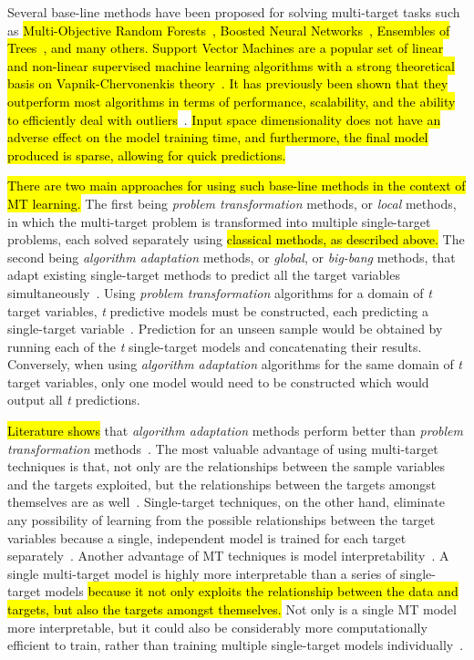 \documentclass[preprint,12pt]{elsarticle}
\begin{document}
Several base-line methods have been proposed for solving multi-target tasks such as \hl{Multi-Objective Random Forests~{\cite{Kocev2010}}, Boosted Neural Networks~{\cite{Hadavandi2015-2}}, Ensembles of Trees~{\cite{Kocev2013}}, and many others. Support Vector Machines are a popular set of linear and non-linear supervised machine learning algorithms with a strong theoretical basis on Vapnik-Chervonenkis theory~{\cite{Vapnik1995}}. It has previously been shown that they outperform most algorithms in terms of performance, scalability, and the ability to efficiently deal with outliers}~\cite{Drucker1997,Kecman}. \hl{Input space dimensionality does not have an adverse effect on the model training time, and furthermore, the final model produced is sparse, allowing for quick predictions.}

\hl{There are two main approaches for using such base-line methods in the context of MT learning.} The first being \textit{problem transformation} methods, or \textit{local} methods, in which the multi-target problem is transformed into multiple single-target problems, each solved separately using \hl{classical methods, as described above.} The second being \textit{algorithm adaptation} methods, or \textit{global}, or \textit{big-bang} methods, that adapt existing single-target methods to predict all the target variables simultaneously~\cite{Borchani2015,Kocev2015}.
Using \textit{problem transformation} algorithms for a domain of \textit{t} target variables, \textit{t} predictive models must be constructed, each predicting a single-target variable~\cite{Kocev2015}. Prediction for an unseen sample would be obtained by running each of the \textit{t} single-target models and concatenating their results. Conversely, when using \textit{algorithm adaptation} algorithms for the same domain of \textit{t} target variables, only one model would need to be constructed which would output all \textit{t} predictions.

\hl{Literature shows} that \textit{algorithm adaptation} methods perform better than \textit{problem transformation} methods~\cite{Kocev2015,Spyromitros2014}. The most valuable advantage of using multi-target techniques is that, not only are the relationships between the sample variables and the targets exploited, but the relationships between the targets amongst themselves are as well~\cite{Baxter1997,Caruana1997}. Single-target techniques, on the other hand, eliminate any possibility of learning from the possible relationships between the target variables because a single, independent model is trained for each target separately~\cite{BenDavic2003}. Another advantage of MT techniques is model interpretability~\cite{Aho2012,Xiong2014}. A single multi-target model is highly more interpretable than a series of single-target models \hl{because it not only exploits the relationship between the data and targets, but also the targets amongst themselves.} Not only is a single MT model more interpretable, but it could also be considerably more computationally efficient to train, rather than training multiple single-target models individually~\cite{Appice2014}. 
\end{document}
